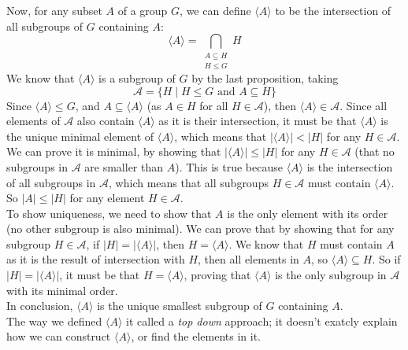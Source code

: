 \documentclass[12pt]{article}
\newcommand{\ang}[1]{\langle #1 \rangle}
\begin{document}
    Now, for any subset $A$ of a group $G$,
    we can define $\ang{A}$
    to be the intersection of all subgroups of $G$
    containing $A$:
    \[ \ang{A} = 
    \bigcap_{\substack{A \subseteq H \\ H \leqslant G}} H \]
    We know that $\ang{A}$ is a subgroup of $G$ by the last proposition,
    taking
    \[ \mathcal{A} = 
    \{ H \mid H \leqslant G \text{ and } A \subseteq H \} \]
    Since $\ang{A} \leqslant G$,
    and $A \subseteq \ang{A}$
    (as $A \in H$ for all $H \in \mathcal{A}$),
    then $\ang{A} \in \mathcal{A}$.
    Since all elements of $\mathcal{A}$ also contain $\ang{A}$
    as it is their intersection,
    it must be that $\ang{A}$
    is the unique minimal element of $\ang{A}$,
    which means that $|\ang{A}| < |H|$
    for any $H \in \mathcal{A}$. \\
    We can prove it is minimal,
    by showing that $|\ang{A}| \leqslant |H|$
    for any $H \in \mathcal{A}$
    (that no subgroups in $\mathcal{A}$ are smaller than $A$).
    This is true because $\ang{A}$
    is the intersection of all subgroups in $\mathcal{A}$,
    which means that all subgroups $H \in \mathcal{A}$
    must contain $\ang{A}$.
    So $|A| \leqslant |H|$ for any element $H \in \mathcal{A}$. \\ 
    To show uniqueness,
    we need to show that $A$ is the only element
    with its order
    (no other subgroup is also minimal).
    We can prove that by showing that for any subgroup
    $H \in \mathcal{A}$,
    if $|H| = |\ang{A}|$,
    then $H = \ang{A}$.
    We know that $H$ must contain $A$
    as it is the result of intersection with $H$,
    then all elements in $A$,
    so $\ang{A} \subseteq H$.
    So if $|H| = |\ang{A}|$,
    it must be that $H = \ang{A}$,
    proving that $\ang{A}$ is the only subgroup in $\mathcal{A}$
    with its minimal order. \\
    In conclusion,
    $\ang{A}$ is the unique smallest subgroup of $G$
    containing $A$. \\

    The way we defined $\ang{A}$
    it called a \textit{top down} approach;
    it doesn't exatcly explain how we can construct $\ang{A}$,
    or find the elements in it. \\
    
\end{document}
